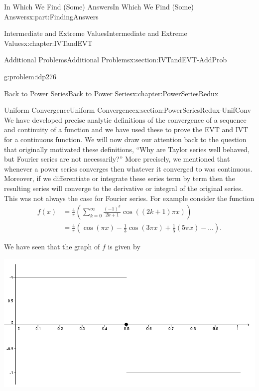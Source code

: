 \documentclass[oneside,10pt,]{book}
\numberwithin{equation}{section}
\newcommand{\amp}{&}
\begin{document}
\begin{partptx}{In Which We Find (Some) Answers}{}{In Which We Find (Some) Answers}{}{}{x:part:FindingAnswers}
\begin{chapterptx}{Intermediate and Extreme Values}{}{Intermediate and Extreme Values}{}{}{x:chapter:IVTandEVT}
\begin{sectionptx}{Additional Problems}{}{Additional Problems}{}{}{x:section:IVTandEVT-AddProb}
\begin{problem}{}{g:problem:idp276}
%
\end{problem}
\end{sectionptx}
\end{chapterptx}
%
\typeout{************************************************}
\typeout{************************************************}
%
\begin{chapterptx}{Back to Power Series}{}{Back to Power Series}{}{}{x:chapter:PowerSeriesRedux}
%
%
\typeout{************************************************}
\typeout{************************************************}
%
\begin{sectionptx}{Uniform Convergence}{}{Uniform Convergence}{}{}{x:section:PowerSeriesRedux-UnifConv}
We have developed precise analytic definitions of the convergence of a sequence and continuity of a function and we have used these to prove the EVT and IVT for a continuous function. We will now draw our attention back to the question that originally motivated these definitions, ``Why are Taylor series well behaved, but Fourier series are not necessarily?'' More precisely, we mentioned that whenever a power series converges then whatever it converged to was continuous. Moreover, if we differentiate or integrate these series term by term then the resulting series will converge to the derivative or integral of the original series. This was not always the case for Fourier series. For example consider the function%
\begin{align*}
f(x) \amp = \frac{4}{\pi}\left(\sum_{k=0}^\infty\frac{(-1)^k}{2k+1}\cos\left((2k+1)\pi x\right)\right)\\
\amp = \frac{4}{\pi}\left(\cos(\pi x)-\frac13\cos(3\pi x)+\frac15 (5\pi x)-\ldots\right)\text{.}
\end{align*}
%
\par
We have seen that the graph of \(f\) is given by%
\begin{image}{0.075}{0.85}{0.075}%
\includegraphics[width=\linewidth]{images/Ch7fig1.png}

\end{image}
\end{sectionptx}
\end{chapterptx}
\end{partptx}
\end{document}
